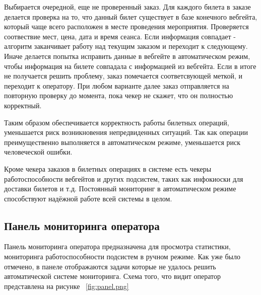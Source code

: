 Выбирается очередной, еще не проверенный заказ. Для каждого билета в заказе делается проверка на то, что данный билет существует в базе конечного вебгейта, который чаще всего расположен в месте проведения мероприятия. Проверяется соотвествие мест, цена, дата и время сеанса. Если информация совпадает - алгоритм заканчивает работу над текущим заказом и переходит к следующему. Иначе делается попытка исправить данные в вебгейте в автоматическом режим, чтобы информация на билете совпадала с информацией из вебгейта. Если в итоге не получается решить проблему, заказ помечается соответсвующей меткой, и переходит к оператору. При любом варианте далее заказ отправляется на повторную проверку до момента, пока чекер не скажет, что он полностью корректный.

Таким образом обеспечивается корректность работы билетных операций, уменьшается риск возникновения непредвиденных ситуаций. Так как операции преимущественно выполняется в автоматическом режиме, уменьшается риск человеческой ошибки. 


Кроме чекера заказов в билетных операциях в системе есть чекеры работоспособности вебгейтов и других подсистем, таких как инфокиоски для доставки билетов и т.д.
Постоянный мониторинг в автоматическом режиме способствуют надёжной работе всей системы в целом.


\subsection{Панель мониторинга оператора}

Панель мониторинга оператора предназначена для просмотра статистики, мониторинга работоспособности подсистем в ручном режиме. Как уже было отмечено, в панеле отображаются  задачи которые не удалось решить автоматической системе мониторинга. Схема того, что видит оператор представлена на рисунке ~\ref{fig:panel.png}

